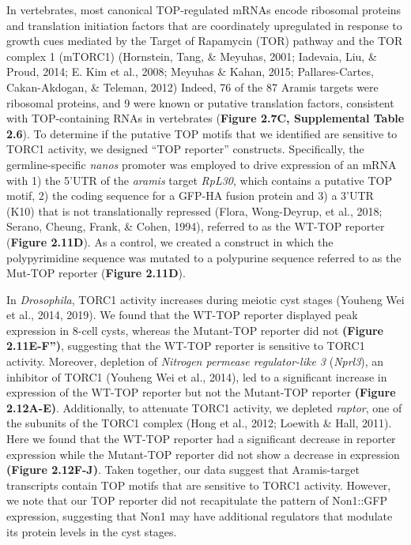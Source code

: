 \documentclass[12pt,oneside]{reedthesis}
\begin{document}
In vertebrates, most canonical TOP-regulated mRNAs encode ribosomal
proteins and translation initiation factors that are coordinately
upregulated in response to growth cues mediated by the Target of
Rapamycin (TOR) pathway and the TOR complex 1 (mTORC1)
(Hornstein, Tang, \& Meyuhas, 2001; Iadevaia, Liu, \& Proud, 2014; E. Kim et al., 2008; Meyuhas \& Kahan, 2015; Pallares-Cartes, Cakan-Akdogan, \& Teleman, 2012) Indeed, 76 of the
87 Aramis targets were ribosomal proteins, and 9 were known or putative
translation factors, consistent with TOP-containing RNAs in vertebrates
(\textbf{Figure 2.7C, Supplemental Table 2.6}). To determine if the putative TOP
motifs that we identified are sensitive to TORC1 activity, we designed
``TOP reporter'' constructs. Specifically, the germline-specific \emph{nanos}
promoter was employed to drive expression of an mRNA with 1) the 5'UTR
of the \emph{aramis} target \emph{RpL30}, which contains a putative TOP motif, 2)
the coding sequence for a GFP-HA fusion protein and 3) a 3'UTR (K10)
that is not translationally repressed (Flora, Wong-Deyrup, et al., 2018; Serano, Cheung, Frank, \& Cohen, 1994), referred to as the WT-TOP
reporter (\textbf{Figure 2.11D}). As a control, we created a construct in which
the polypyrimidine sequence was mutated to a polypurine sequence
referred to as the Mut-TOP reporter (\textbf{Figure 2.11D}).

In \emph{Drosophila}, TORC1 activity increases during meiotic cyst stages
(Youheng Wei et al., 2014, 2019). We found that the WT-TOP reporter displayed
peak expression in 8-cell cysts, whereas the Mutant-TOP reporter did not
\textbf{(Figure 2.11E-F'')}, suggesting that the WT-TOP reporter is sensitive to
TORC1 activity. Moreover, depletion of \emph{Nitrogen permease regulator-like
3} (\emph{Nprl3}), an inhibitor of TORC1 (Youheng Wei et al., 2014), led to a significant
increase in expression of the WT-TOP reporter but not the Mutant-TOP
reporter \textbf{(Figure 2.12A-E)}. Additionally, to attenuate TORC1 activity,
we depleted \emph{raptor}, one of the subunits of the TORC1 complex
(Hong et al., 2012; Loewith \& Hall, 2011). Here we found that the WT-TOP
reporter had a significant decrease in reporter expression while the
Mutant-TOP reporter did not show a decrease in expression \textbf{(Figure 2.12F-J)}.
Taken together, our data suggest that Aramis-target
transcripts contain TOP motifs that are sensitive to TORC1 activity.
However, we note that our TOP reporter did not recapitulate the pattern
of Non1::GFP expression, suggesting that Non1 may have additional
regulators that modulate its protein levels in the cyst stages.
\end{document}
